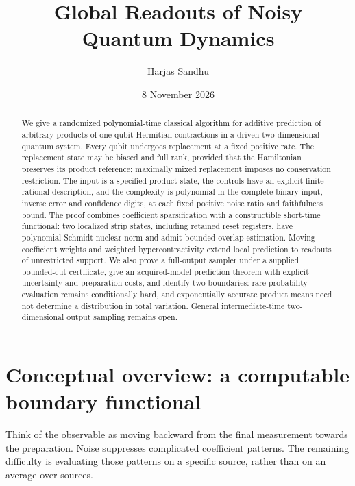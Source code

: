 \documentclass[11pt,reqno]{amsart}
\title[Global readouts of noisy quantum dynamics]{Global Readouts of Noisy Quantum Dynamics}
\author{Harjas Sandhu}
\date{8 November 2026}
\numberwithin{equation}{section}
\theoremstyle{definition}
\theoremstyle{remark}
\begin{document}
\raggedbottom
\begin{abstract}
We give a randomized polynomial-time classical algorithm for additive prediction of arbitrary products of one-qubit Hermitian contractions in a driven two-dimensional quantum system. Every qubit undergoes replacement at a fixed positive rate. The replacement state may be biased and full rank, provided that the Hamiltonian preserves its product reference; maximally mixed replacement imposes no conservation restriction. The input is a specified product state, the controls have an explicit finite rational description, and the complexity is polynomial in the complete binary input, inverse error and confidence digits, at each fixed positive noise ratio and faithfulness bound. The proof combines coefficient sparsification with a constructible short-time functional: two localized strip states, including retained reset registers, have polynomial Schmidt nuclear norm and admit bounded overlap estimation. Moving coefficient weights and weighted hypercontractivity extend local prediction to readouts of unrestricted support. We also prove a full-output sampler under a supplied bounded-cut certificate, give an acquired-model prediction theorem with explicit uncertainty and preparation costs, and identify two boundaries: rare-probability evaluation remains conditionally hard, and exponentially accurate product means need not determine a distribution in total variation. General intermediate-time two-dimensional output sampling remains open.
\end{abstract}
\maketitle
\setcounter{tocdepth}{1}
\tableofcontents
\clearpage
\section{Conceptual overview: a computable boundary functional}\label{sec:overview}

Think of the observable as moving backward from the final measurement towards the preparation. Noise suppresses complicated coefficient patterns. The remaining difficulty is evaluating those patterns on a specific source, rather than on an average over sources.
\end{document}

